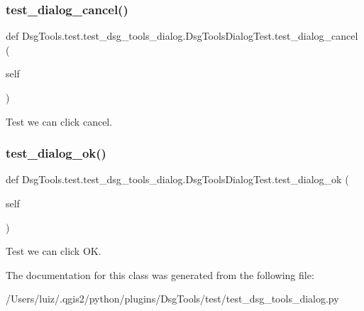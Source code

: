 \subsubsection{\texorpdfstring{test\+\_\+dialog\+\_\+cancel()}{test\_dialog\_cancel()}}
{\footnotesize\ttfamily def Dsg\+Tools.\+test.\+test\+\_\+dsg\+\_\+tools\+\_\+dialog.\+Dsg\+Tools\+Dialog\+Test.\+test\+\_\+dialog\+\_\+cancel (\begin{DoxyParamCaption}\item[{}]{self }\end{DoxyParamCaption})}

\begin{DoxyVerb}Test we can click cancel.\end{DoxyVerb}
 \mbox{\label{class_dsg_tools_1_1test_1_1test__dsg__tools__dialog_1_1_dsg_tools_dialog_test_a1178967d97c781f58b6eeca8a7757587}} 
\subsubsection{\texorpdfstring{test\+\_\+dialog\+\_\+ok()}{test\_dialog\_ok()}}
{\footnotesize\ttfamily def Dsg\+Tools.\+test.\+test\+\_\+dsg\+\_\+tools\+\_\+dialog.\+Dsg\+Tools\+Dialog\+Test.\+test\+\_\+dialog\+\_\+ok (\begin{DoxyParamCaption}\item[{}]{self }\end{DoxyParamCaption})}

\begin{DoxyVerb}Test we can click OK.\end{DoxyVerb}
 

The documentation for this class was generated from the following file\+:\begin{DoxyCompactItemize}
\item 
/\+Users/luiz/.\+qgis2/python/plugins/\+Dsg\+Tools/test/test\+\_\+dsg\+\_\+tools\+\_\+dialog.\+py\end{DoxyCompactItemize}
